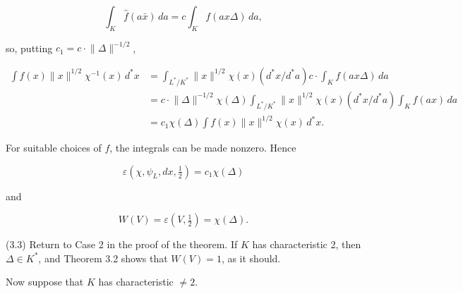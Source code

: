 \documentclass[9pt,twoside]{extarticle}
\begin{document}
{\[
\int_K\widehat f(a\bar x)\,da=c\int_K f(ax\Delta)\,da,
\]

so, putting \(c_1=c\cdot\lVert\Delta\rVert^{-1/2}\),\par

\[
\begin{aligned}
\int \widehat f(x)\lVert x\rVert^{1/2}\chi^{-1}(x)\,d^*x
&=\int_{L^*/K^*}\lVert x\rVert^{1/2}\chi(x)(d^*x/d^*a)c\cdot
  \int_K f(ax\Delta)\,da\\
&=c\cdot\lVert\Delta\rVert^{-1/2}\chi(\Delta)
  \int_{L^*/K^*}\lVert x\rVert^{1/2}\chi(x)(d^*x/d^*a)
  \int_K f(ax)\,da\\
&=c_1\chi(\Delta)\int f(x)\lVert x\rVert^{1/2}\chi(x)\,d^*x.
\end{aligned}
\]

For suitable choices of \(f\), the integrals can be made nonzero. Hence\par

\[
\varepsilon\!\left(\chi,\psi_L,dx,\tfrac12\right)=c_1\chi(\Delta)
\]

and\par

\[
W(V)=\varepsilon\!\left(V,\tfrac12\right)=\chi(\Delta).
\]

(3.3) Return to Case 2 in the proof of the theorem. If \(K\) has characteristic 2, then \(\Delta\in K^*\), and Theorem 3.2 shows that \(W(V)=1\), as it should.\par

Now suppose that \(K\) has characteristic \(\neq2\).\par
}
\end{document}
